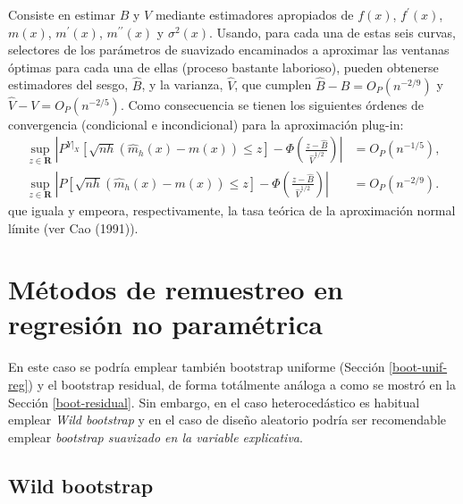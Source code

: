 \documentclass[
]{book}
\theoremstyle{break}
\theoremstyle{definition}
\theoremstyle{definition}
\theoremstyle{definition}
\theoremstyle{definition}
\theoremstyle{remark}
\begin{document}
Consiste en estimar \(B\) y \(V\) mediante estimadores apropiados de
\(f\left(x \right)\), \(f^{\prime}\left( x \right)\), \(m\left( x \right)\),
\(m^{\prime}\left( x \right)\), \(m^{\prime \prime }\left( x \right)\) y
\(\sigma^2\left( x \right)\). Usando, para cada una de estas seis curvas,
selectores de los parámetros de suavizado encaminados a aproximar las
ventanas óptimas para cada una de ellas (proceso bastante laborioso),
pueden obtenerse estimadores del sesgo, \(\hat{B}\), y la varianza,
\(\hat{V}\), que cumplen \(\hat{B}-B=O_{P}\left( n^{-2/9} \right)\) y
\(\hat{V}-V=O_{P}\left( n^{-2/5} \right)\).
Como consecuencia se tienen los siguientes órdenes de convergencia
(condicional e incondicional) para la aproximación plug-in:
\[\begin{aligned}
\sup_{z\in \boldsymbol{R}}\left\vert P^{\left. Y\right\vert _{X}}\left[ 
\sqrt{nh}\left( \hat{m}_{h}\left( x \right) -m\left( x \right) \right) \leq z
\right] -\Phi \left( \frac{z-\hat{B}}{\hat{V}^{1/2}} \right) \right\vert
&= O_{P}\left( n^{-1/5} \right), \\
\sup_{z\in \boldsymbol{R}}\left\vert P\left[ \sqrt{nh}\left( \hat{m}
_{h}\left( x \right) -m\left( x \right) \right) \leq z\right] -\Phi \left( 
\frac{z-\hat{B}}{\hat{V}^{1/2}} \right) \right\vert &= O_{P}\left(
n^{-2/9} \right).
\end{aligned}\]
que iguala y empeora, respectivamente,
la tasa teórica de la aproximación normal límite (ver Cao (1991)).

\hypertarget{muxe9todos-de-remuestreo-en-regresiuxf3n-no-paramuxe9trica}{%
\section{Métodos de remuestreo en regresión no paramétrica}\label{muxe9todos-de-remuestreo-en-regresiuxf3n-no-paramuxe9trica}}

En este caso se podría emplear también bootstrap uniforme (Sección \ref{boot-unif-reg}) y el bootstrap residual, de forma totálmente análoga a como se mostró en la Sección \ref{boot-residual}.
Sin embargo, en el caso heterocedástico es habitual emplear \emph{Wild bootstrap} y en el caso de diseño aleatorio podría ser recomendable emplear \emph{bootstrap suavizado en la variable explicativa}.

\hypertarget{wild-bootstrap}{%
\subsection{Wild bootstrap}\label{wild-bootstrap}}
\end{document}
